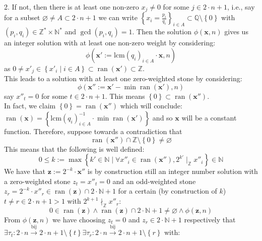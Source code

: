 \begin{solution}
    2. If not, then there is at least one non-zero \( x_j \neq 0 \) for some \( j \in 2 \cdot n + 1 \), i.e., say for a subset \( \varnothing \neq A \subset 2 \cdot n + 1 \) we can write \( \left\{x_i = \frac{p_i}{q_i}\right\}_{i \in A} \subset \mathbb{Q} \setminus \left\{0\right\} \) with \( \left(p_i, q_i\right) \in \mathbb{Z}^{*} \times \mathbb{N}^{*} \) and \( \gcd\left(p_i, q_i\right) = 1 \). Then the solution \( \phi\left(\mathbf{x}, n\right) \) gives us an integer solution with at least one non-zero weight by considering:
    \[
        \phi\left(\mathbf{x}':= \text{lcm}\left(q_i\right)_{i \in A} \cdot \mathbf{x}, n\right)
    \]
    as \( 0 \neq x'_j \in \left\{x'_i \mid i \in A\right\} \subset \operatorname{ran}\left(\mathbf{x}'\right) \subset \mathbb{Z} \). \\
    This leads to a solution with at least one zero-weighted stone by considering:
    \[
        \phi\left(\mathbf{x}'' := \mathbf{x}' - \min \operatorname{ran}\left(\mathbf{x}'\right), n\right)
    \]
    say \( x''_t = 0 \) for some \( t \in 2 \cdot n + 1 \). This means \( \left\{0\right\} \subset \operatorname{ran}\left(\mathbf{x}''\right) \). \\
    In fact, we claim \( \left\{0\right\} = \operatorname{ran}\left(\mathbf{x}''\right) \) which will conclude: \( \operatorname{ran}\left(\mathbf{x}\right) = \left\{\text{lcm}\left(q_i\right)_{i \in A}^{-1} \cdot \min \operatorname{ran}\left(\mathbf{x}'\right)\right\} \) and so \( \mathbf{x} \) will be a constant function. Therefore, suppose towards a contradiction that
    \[
        \operatorname{ran}\left(\mathbf{x}''\right) \cap \mathbb{Z} \setminus \left\{0\right\} \neq \varnothing
    \]
    This means that the following is well defined:
    \[
        0 \leq k := \max \left\{ k' \in \mathbb{N} \mid \forall x''_i \in \operatorname{ran}\left(\mathbf{x}''\right), 2^{k'} \mid_{\mathbb{Z}} x''_i \right\} \in \mathbb{N}
    \]
    We have that \( \mathbf{z} := 2^{-k} \cdot \mathbf{x}'' \) is by construction still an integer number solution with a zero-weighted stone \( z_t = x''_t = 0 \) and an odd-weighted stone \( z_r = 2^{-k} \cdot x''_r \in \operatorname{ran}\left(\mathbf{z}\right) \cap 2 \cdot \mathbb{N} + 1 \) for a certain (by construction of \( k \)) \( t \neq r \in 2 \cdot n + 1 > 1 \) with \( 2^{k+1} \nmid_{\mathbb{Z}} x''_r \):
    \[
        0 \in \operatorname{ran}\left(\mathbf{z}\right) \wedge \operatorname{ran}\left(\mathbf{z}\right) \cap 2 \cdot \mathbb{N} + 1 \neq \varnothing \wedge \phi\left(\mathbf{z}, n\right)
    \]
    From \( \phi\left(\mathbf{z}, n\right) \) we have choosing \( z_t = 0 \) and \( z_r \in 2 \cdot \mathbb{N} + 1 \) respectively that \( \exists \tau_t: 2 \cdot n \overset{\text{bij}}{\rightarrow} 2 \cdot n + 1 \setminus \left\{t\right\} \exists \tau_r: 2 \cdot n \overset{\text{bij}}{\rightarrow} 2 \cdot n + 1 \setminus \left\{r\right\} \) with:

\end{solution}
